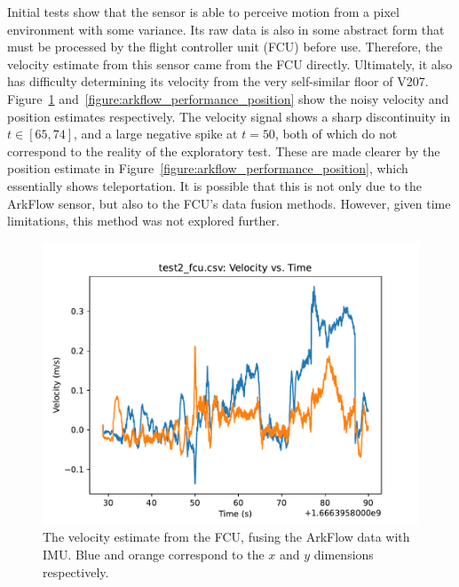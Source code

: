 Initial tests show that the sensor is able to perceive motion from a pixel environment
with some variance.
Its raw data is also in some abstract form that must be processed by the flight controller unit (FCU)
before use.
Therefore, the velocity estimate from this sensor came from the FCU directly.
Ultimately, it also has difficulty determining its velocity from the very self-similar floor of V207.
Figure~\ref{figure:arkflow_performance_velocity} and~\ref{figure:arkflow_performance_position} show
the noisy velocity and position estimates respectively.
The velocity signal shows a sharp discontinuity in $t\in[65, 74]$,
and a large negative spike at $t=50$,
both of which do not correspond to the reality of the exploratory test.
These are made clearer by the position estimate in Figure~\ref{figure:arkflow_performance_position},
which essentially shows teleportation.
It is possible that this is not only due to the ArkFlow sensor, but also to the FCU's data fusion methods.
However, given time limitations, this method was not explored further.

\begin{figure}
	\centering
	\includegraphics[width=\linewidth]{./images/test2_fcu_velocity}
	\caption{The velocity estimate from the FCU, fusing the ArkFlow data with IMU. Blue and orange correspond to the $x$ and $y$ dimensions respectively.}
	\label{figure:arkflow_performance_velocity}
\end{figure}

